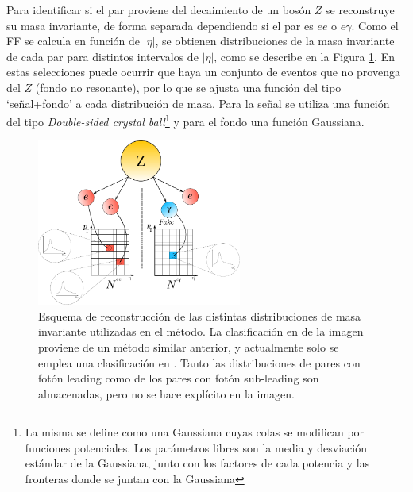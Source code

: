 Para identificar si el par proviene del decaimiento de un bosón $Z$ se reconstruye su masa invariante, de forma separada dependiendo si el par es $ee$ o $e\gamma$. Como el FF se calcula en función de $|\eta|$, se obtienen distribuciones de la masa invariante de cada par para distintos intervalos de $|\eta|$, como se describe en la Figura \ref{fig:efakes_matrix}. En estas selecciones puede ocurrir que haya un conjunto de eventos que no provenga del $Z$ (fondo no resonante), por lo que se ajusta una función del tipo `señal+fondo' a cada distribución de masa. Para la señal se utiliza una función del tipo \textit{Double-sided crystal ball}\footnote{La misma se define como una Gaussiana cuyas colas se modifican por funciones potenciales. Los parámetros libres son la media y desviación estándar de la Gaussiana, junto con los factores de cada potencia y las fronteras donde se juntan con la Gaussiana} \cite{Das:2016stf} y para el fondo una función Gaussiana.

\begin{figure}
  \centering
  \includegraphics[width=0.6\textwidth]{images/analysis/grid_en_2.pdf}
  \caption{Esquema de reconstrucción de las distintas distribuciones de masa invariante utilizadas en el método. La clasificación en \pt de la imagen proviene de un método similar anterior, y actualmente solo se emplea una clasificación en \absEta. Tanto las distribuciones de pares con fotón leading como de los pares con fotón sub-leading son almacenadas, pero no se hace explícito en la imagen.}
  \label{fig:efakes_matrix}
\end{figure}

